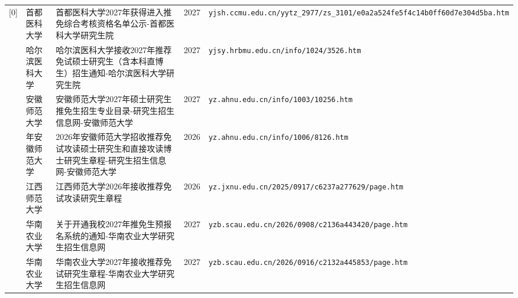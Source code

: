 {\begin{longtable}{@{}p{1.15cm}p{2.9cm}p{6.3cm}p{0.85cm}p{5.0cm}@{}}
[0] & 首都医科大学 & 首都医科大学2027年获得进入推免综合考核资格名单公示-首都医科大学研究生院 & 2027 & \texttt{yjsh.ccmu.edu.cn/yytz\_2977/zs\_3101/e0a2a524fe5f4c14b0ff60d7e304d5ba.htm} \\
[0] & 哈尔滨医科大学 & 哈尔滨医科大学接收2027年推荐免试硕士研究生（含本科直博生）招生通知-哈尔滨医科大学研究生院 & 2027 & \texttt{yjsy.hrbmu.edu.cn/info/1024/3526.htm} \\
[0] & 安徽师范大学 & 安徽师范大学2027年硕士研究生推免生招生专业目录-研究生招生信息网-安徽师范大学 & 2027 & \texttt{yz.ahnu.edu.cn/info/1003/10256.htm} \\
[0] & 年安徽师范大学 & 2026年安徽师范大学招收推荐免试攻读硕士研究生和直接攻读博士研究生章程-研究生招生信息网-安徽师范大学 & 2026 & \texttt{yz.ahnu.edu.cn/info/1006/8126.htm} \\
[0] & 江西师范大学 & 江西师范大学2026年接收推荐免试攻读研究生章程 & 2026 & \texttt{yz.jxnu.edu.cn/2025/0917/c6237a277629/page.htm} \\
[0] & 华南农业大学 & 关于开通我校2027年推免生预报名系统的通知-华南农业大学研究生招生信息网 & 2027 & \texttt{yzb.scau.edu.cn/2026/0908/c2136a443420/page.htm} \\
[0] & 华南农业大学 & 华南农业大学2027年接收推荐免试研究生章程-华南农业大学研究生招生信息网 & 2027 & \texttt{yzb.scau.edu.cn/2026/0916/c2132a445853/page.htm} \\
\bottomrule
\end{longtable}
}
